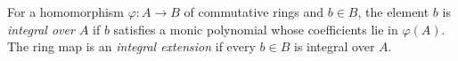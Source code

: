 
For a homomorphism $\varphi:A\to B$ of commutative rings and $b\in B$, the element $b$ is \emph{integral over $A$} if $b$ satisfies a monic polynomial whose coefficients lie in $\varphi(A)$. The ring map is an \emph{integral extension} if every $b\in B$ is integral over $A$.
